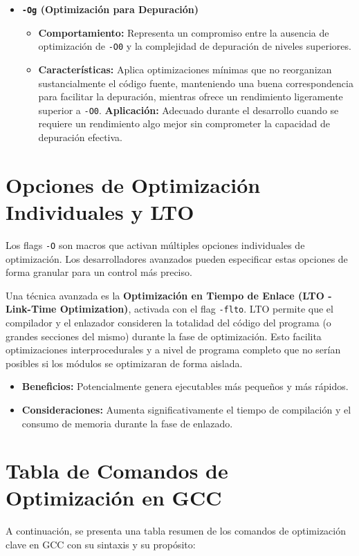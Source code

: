 \documentclass{article}
\begin{document}
\begin{itemize}[leftmargin=*,noitemsep,topsep=0pt]
		\item \textbf{\texttt{-Og} (Optimización para Depuración)}
		\begin{itemize}[leftmargin=*,noitemsep,topsep=0pt]
			\item \textbf{Comportamiento:} Representa un compromiso entre la ausencia de optimización de \texttt{-O0} y la complejidad de depuración de niveles superiores.
			\item \textbf{Características:} Aplica optimizaciones mínimas que no reorganizan sustancialmente el código fuente, manteniendo una buena correspondencia para facilitar la depuración, mientras ofrece un rendimiento ligeramente superior a \texttt{-O0}.
			\textbf{Aplicación:} Adecuado durante el desarrollo cuando se requiere un rendimiento algo mejor sin comprometer la capacidad de depuración efectiva.
		\end{itemize}
	\end{itemize}
	
	\section{Opciones de Optimización Individuales y LTO}
	Los flags \texttt{-O} son macros que activan múltiples opciones individuales de optimización. Los desarrolladores avanzados pueden especificar estas opciones de forma granular para un control más preciso.
	
	Una técnica avanzada es la \textbf{Optimización en Tiempo de Enlace (LTO - Link-Time Optimization)}, activada con el flag \texttt{-flto}. LTO permite que el compilador y el enlazador consideren la totalidad del código del programa (o grandes secciones del mismo) durante la fase de optimización. Esto facilita optimizaciones interprocedurales y a nivel de programa completo que no serían posibles si los módulos se optimizaran de forma aislada.
	\begin{itemize}[leftmargin=*,noitemsep,topsep=0pt]
		\item \textbf{Beneficios:} Potencialmente genera ejecutables más pequeños y más rápidos.
		\item \textbf{Consideraciones:} Aumenta significativamente el tiempo de compilación y el consumo de memoria durante la fase de enlazado.
	\end{itemize}
	
	\section{Tabla de Comandos de Optimización en GCC}
	A continuación, se presenta una tabla resumen de los comandos de optimización clave en GCC con su sintaxis y su propósito:
	
\end{document}
